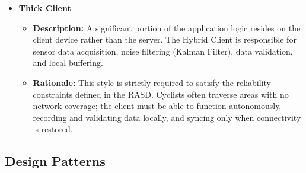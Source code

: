 \begin{itemize}
    \item \textbf{Thick Client}
    \begin{itemize}
        \item \textbf{Description:} A significant portion of the application logic resides on the client device rather than the server. The Hybrid Client is responsible for sensor data acquisition, noise filtering (Kalman Filter), data validation, and local buffering.
        \item \textbf{Rationale:} This style is strictly required to satisfy the reliability constraints defined in the RASD. Cyclists often traverse areas with no network coverage; the client must be able to function autonomously, recording and validating data locally, and syncing only when connectivity is restored.
    \end{itemize}
\end{itemize}

\subsection{Design Patterns}

